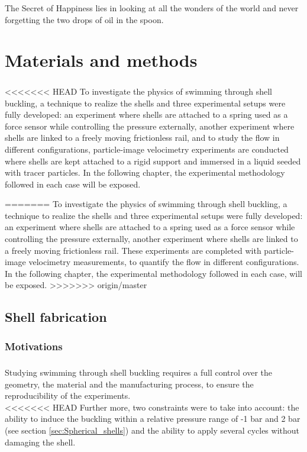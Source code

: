 \begin{savequote}
The Secret of Happiness lies in looking at all the wonders of the world and never forgetting the two drops of oil in the spoon.
\end{savequote}
\chapter{Materials and methods}
\newpage
\paragraph{}
<<<<<<< HEAD
To investigate the physics of swimming through shell buckling, a technique to realize the shells and  three experimental setups were fully developed: an experiment where shells are attached to a spring used as a force sensor while controlling the pressure externally, another experiment where shells are linked to a freely moving frictionless rail, and to study the flow in different configurations, particle-image velocimetry experiments are conducted where shells are kept attached to a rigid support and immersed in a liquid seeded with tracer particles. In the following chapter, the experimental methodology followed in each case will be exposed.

=======
To investigate the physics of swimming through shell buckling, a technique to realize the shells and  three experimental setups were fully developed: an experiment where shells are attached to a spring used as a force sensor while controlling the pressure externally, another experiment where shells are linked to a freely moving frictionless rail. These experiments are completed with particle-image velocimetry measurements, to quantify the flow in different configurations. In the following chapter, the experimental methodology followed in each case, will be exposed. 
>>>>>>> origin/master
\section{Shell fabrication}
\subsection{Motivations}
\paragraph{}
Studying swimming through shell buckling requires a full control over the geometry, the material and the manufacturing process, to ensure the reproducibility of the experiments.\\
<<<<<<< HEAD
Further more, two constraints were to take into account: the ability to induce the buckling within a relative pressure range of -1 bar and 2 bar (see section \ref{sec:Spherical_shells}) and the ability to apply several cycles without damaging the shell. 

